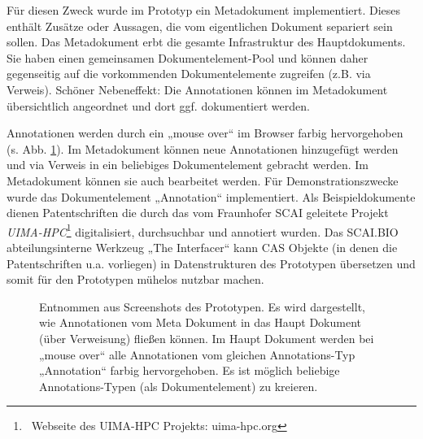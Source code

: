  
Für diesen Zweck wurde im Prototyp ein Metadokument implementiert. Dieses enthält Zusätze oder Aussagen, die vom eigentlichen Dokument separiert sein sollen. Das Metadokument erbt die gesamte Infrastruktur des Hauptdokuments. Sie haben einen  gemeinsamen Dokumentelement-Pool und können daher gegenseitig auf die vorkommenden Dokumentelemente zugreifen (z.B. via Verweis). Schöner Nebeneffekt: Die Annotationen können im Metadokument übersichtlich angeordnet und dort ggf. dokumentiert werden.

 
Annotationen werden durch ein „mouse over“ im Browser farbig hervorgehoben (s. Abb. \ref{annotation}). Im Metadokument können neue Annotationen hinzugefügt werden und via Verweis in ein beliebiges Dokumentelement gebracht werden. Im Metadokument können sie auch bearbeitet werden. Für Demonstrationszwecke wurde das Dokumentelement „Annotation“ implementiert. Als Beispieldokumente dienen Patentschriften die durch das vom Fraunhofer SCAI geleitete Projekt \emph{UIMA-HPC}\footnote{~Webseite des UIMA-HPC Projekts: uima-hpc.org} digitalisiert, durchsuchbar und annotiert wurden. Das SCAI.BIO abteilungsinterne Werkzeug „The Interfacer“ kann CAS Objekte (in denen die Patentschriften u.a. vorliegen) in Datenstrukturen des Prototypen übersetzen und somit für den Prototypen mühelos nutzbar machen.

 
\begin{figure}[h!]
\centering
\advance\leftskip-2.5cm
\caption{ Entnommen aus Screenshots des Prototypen. Es wird dargestellt, wie Annotationen vom Meta Dokument in das Haupt Dokument (über Verweisung) fließen können. Im Haupt Dokument werden bei „mouse over“ alle Annotationen vom gleichen Annotations-Typ „Annotation“ farbig hervorgehoben. Es ist möglich beliebige Annotations-Typen (als Dokumentelement) zu kreieren. }\label{annotation}
\end{figure}
 
